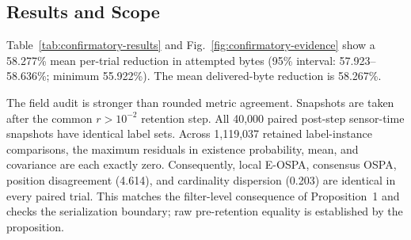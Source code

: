 \subsection{Results and Scope}

Table~\ref{tab:confirmatory-results} and
Fig.~\ref{fig:confirmatory-evidence} show a 58.277\% mean per-trial reduction in
attempted bytes (95\% interval: 57.923--58.636\%; minimum 55.922\%). The mean
delivered-byte reduction is 58.267\%.

The field audit is stronger than rounded metric agreement. Snapshots are taken
after the common $r>10^{-2}$ retention step. All 40,000 paired post-step
sensor-time snapshots have identical label sets. Across 1,119,037 retained
label-instance comparisons, the maximum residuals in existence
probability, mean, and covariance are each exactly zero. Consequently, local
E-OSPA, consensus OSPA, position disagreement (4.614), and cardinality
dispersion (0.203) are identical in every paired trial. This matches
the filter-level consequence of Proposition~1 and checks the serialization
boundary; raw pre-retention equality is established by the proposition.
